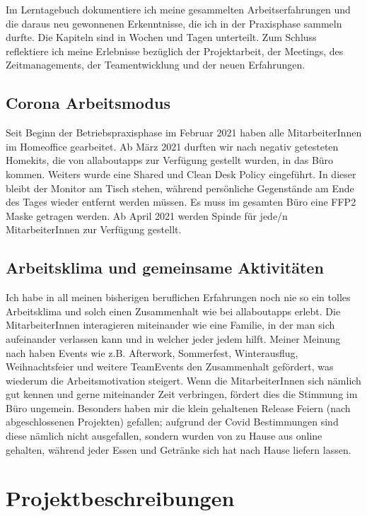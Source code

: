 Im Lerntagebuch dokumentiere ich meine gesammelten Arbeitserfahrungen und die daraus neu gewonnenen Erkenntnisse, die ich in der Praxisphase sammeln durfte. Die Kapiteln sind in Wochen und Tagen unterteilt. Zum Schluss reflektiere ich meine Erlebnisse bezüglich der Projektarbeit, der Meetings, des Zeitmanagements, der Teamentwicklung und der neuen Erfahrungen.

\section{Corona Arbeitsmodus}

Seit Beginn der Betriebspraxisphase im Februar 2021 haben alle MitarbeiterInnen im Homeoffice gearbeitet. Ab März 2021 durften wir nach negativ getesteten Homekits, die von allaboutapps zur Verfügung gestellt wurden, in das Büro kommen. Weiters wurde eine Shared und Clean Desk Policy eingeführt. In dieser bleibt der Monitor am Tisch stehen, während persönliche Gegenstände am Ende des Tages wieder entfernt werden müssen. Es muss im gesamten Büro eine FFP2 Maske getragen werden. Ab April 2021 werden Spinde für jede/n MitarbeiterInnen zur Verfügung gestellt.

\section{Arbeitsklima und gemeinsame Aktivitäten}

Ich habe in all meinen bisherigen beruflichen Erfahrungen noch nie so ein tolles Arbeitsklima und solch einen Zusammenhalt wie bei allaboutapps erlebt. Die MitarbeiterInnen interagieren miteinander wie eine Familie, in der man sich aufeinander verlassen kann und in welcher jeder jedem hilft. Meiner Meinung nach haben Events wie z.B. Afterwork, Sommerfest, Winterausflug, Weihnachtsfeier und weitere TeamEvents den Zusammenhalt gefördert, was wiederum die Arbeitsmotivation steigert. Wenn die MitarbeiterInnen sich nämlich gut kennen und gerne miteinander Zeit verbringen, fördert dies die Stimmung im Büro ungemein. Besonders haben mir die klein gehaltenen Release Feiern (nach abgeschlossenen Projekten) gefallen; aufgrund der Covid Bestimmungen sind diese nämlich nicht ausgefallen, sondern wurden von zu Hause aus online gehalten, während jeder Essen und Getränke sich hat nach Hause liefern lassen.

\chapter{Projektbeschreibungen}

